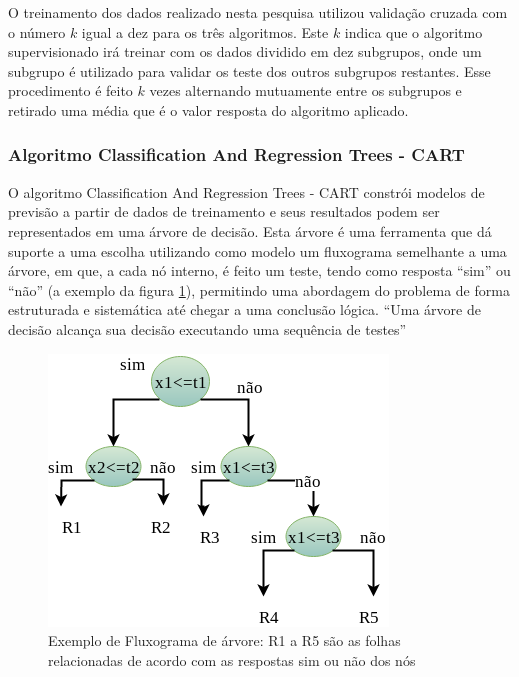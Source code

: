 O treinamento dos dados realizado nesta pesquisa utilizou validação cruzada com o número  ${k}$ igual a dez  para os três algoritmos. Este ${k}$ indica que o algoritmo supervisionado irá treinar com os dados dividido em dez subgrupos, onde um subgrupo é utilizado para validar os teste dos outros subgrupos restantes. Esse procedimento é feito ${k}$ vezes alternando mutuamente entre os subgrupos e retirado uma média que é o valor resposta do algoritmo aplicado.


\subsubsection{Algoritmo Classification And Regression Trees  - CART}\label{cap:refTeor:sssec:cart}


O algoritmo Classification And Regression Trees - CART constrói modelos de previsão a partir de dados de treinamento e seus resultados podem ser representados em uma árvore de decisão. Esta árvore  é uma ferramenta que dá suporte a uma escolha utilizando como modelo um fluxograma semelhante a uma árvore, em que, a cada nó interno, é feito um teste, tendo como resposta “sim” ou “não” (a exemplo da figura \ref{fig:fluxogramaarvore}), permitindo uma abordagem do problema de forma estruturada e sistemática até chegar a uma conclusão lógica. ``Uma árvore de decisão alcança sua decisão executando uma sequência de testes'' \cite[p. 811]{RusselStuart.Norvig2013}

 \begin{figure}[h!]
    \centering
      \includegraphics[scale=0.5]{figs/arvoredecisao_nos.png}
      \caption{Exemplo de Fluxograma de árvore: R1 a R5 são as folhas relacionadas de acordo com as respostas sim ou não dos nós} \label{fig:fluxogramaarvore}
\end{figure}

